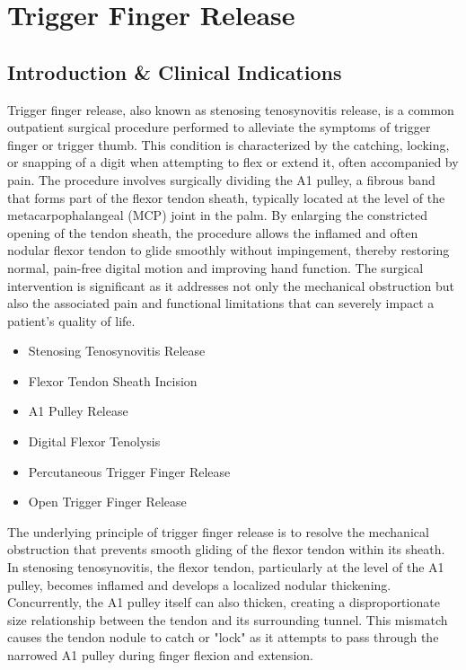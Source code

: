 \chapter{Trigger Finger Release}

\section*{Introduction \& Clinical Indications}
Trigger finger release, also known as stenosing tenosynovitis release, is a common outpatient surgical procedure performed to alleviate the symptoms of trigger finger or trigger thumb. This condition is characterized by the catching, locking, or snapping of a digit when attempting to flex or extend it, often accompanied by pain. The procedure involves surgically dividing the A1 pulley, a fibrous band that forms part of the flexor tendon sheath, typically located at the level of the metacarpophalangeal (MCP) joint in the palm. By enlarging the constricted opening of the tendon sheath, the procedure allows the inflamed and often nodular flexor tendon to glide smoothly without impingement, thereby restoring normal, pain-free digital motion and improving hand function. The surgical intervention is significant as it addresses not only the mechanical obstruction but also the associated pain and functional limitations that can severely impact a patient's quality of life.

\begin{itemize}
  \item Stenosing Tenosynovitis Release
  \item Flexor Tendon Sheath Incision
  \item A1 Pulley Release
  \item Digital Flexor Tenolysis
  \item Percutaneous Trigger Finger Release
  \item Open Trigger Finger Release
\end{itemize}

The underlying principle of trigger finger release is to resolve the mechanical obstruction that prevents smooth gliding of the flexor tendon within its sheath. In stenosing tenosynovitis, the flexor tendon, particularly at the level of the A1 pulley, becomes inflamed and develops a localized nodular thickening. Concurrently, the A1 pulley itself can also thicken, creating a disproportionate size relationship between the tendon and its surrounding tunnel. This mismatch causes the tendon nodule to catch or "lock" as it attempts to pass through the narrowed A1 pulley during finger flexion and extension.


